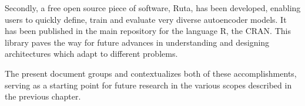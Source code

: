 \documentclass[oneside,openright,titlepage,numbers=noenddot,openany,headinclude,footinclude=true,
cleardoublepage=empty,abstractoff,BCOR=5mm,paper=a4,fontsize=12pt,main=spanish]{scrreprt}
\begin{document}
Secondly, a free open source piece of software, Ruta, has been developed, enabling users to quickly define, train and evaluate very diverse autoencoder models. It has been published in the main repository for the language R, the CRAN. This library paves the way for future advances in understanding and designing architectures which adapt to different problems.

The present document groups and contextualizes both of these accomplishments, serving as a starting point for future research in the various scopes described in the previous chapter.


   
\end{document}
